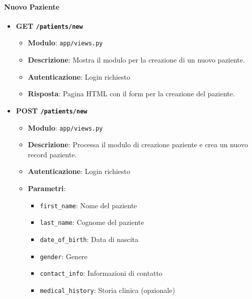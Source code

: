 \documentclass[12pt,a4paper,oneside]{report}
\begin{document}
\paragraph{Nuovo Paziente}
\begin{itemize}
    \item \textbf{GET \texttt{/patients/new}}
          \begin{itemize}
              \item \textbf{Modulo}: \texttt{app/views.py}
              \item \textbf{Descrizione}: Mostra il modulo per la creazione di un nuovo paziente.
              \item \textbf{Autenticazione}: Login richiesto
              \item \textbf{Risposta}: Pagina HTML con il form per la creazione del paziente.
          \end{itemize}

    \item \textbf{POST \texttt{/patients/new}}
          \begin{itemize}
              \item \textbf{Modulo}: \texttt{app/views.py}
              \item \textbf{Descrizione}: Processa il modulo di creazione paziente e crea un nuovo record paziente.
              \item \textbf{Autenticazione}: Login richiesto
              \item \textbf{Parametri}:
                    \begin{itemize}
                        \item \texttt{first\_name}: Nome del paziente
                        \item \texttt{last\_name}: Cognome del paziente
                        \item \texttt{date\_of\_birth}: Data di nascita
                        \item \texttt{gender}: Genere
                        \item \texttt{contact\_info}: Informazioni di contatto
                        \item \texttt{medical\_history}: Storia clinica (opzionale)
                    \end{itemize}
          \end{itemize}
\end{itemize}
\end{document}
